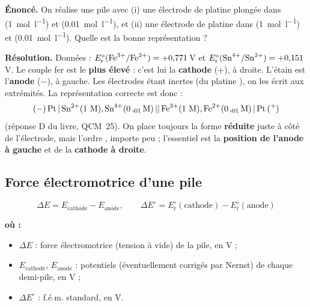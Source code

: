 \documentclass[11pt,a4paper]{article}
\newenvironment{ou}{%
  \par\smallskip\noindent\textbf{où :}\nopagebreak
  \begin{itemize}[leftmargin=1.8em,topsep=2pt,itemsep=1.5pt,parsep=0pt]}%
  {\end{itemize}}
\newcommand{\degner}[1]{\ensuremath{E_{\mathrm{r}}^{\circ}(#1)}}  %
\newcommand{\fem}{\ensuremath{\Delta E}}        %
\begin{document}
\begin{exemple}
\textbf{Énoncé.} On réalise une pile avec (i) une électrode de platine plongée dans
 (\SI{1}{mol\per\litre}) et  (\SI{0.01}{mol\per\litre}), et (ii) une
électrode de platine dans  (\SI{1}{mol\per\litre}) et  (\SI{0.01}{mol\per\litre}).
Quelle est la bonne représentation ?

\textbf{Résolution.} Données : $\degner{\ce{Fe^{3+}}/\ce{Fe^{2+}}}=+0{,}771$\,V et
$\degner{\ce{Sn^{4+}}/\ce{Sn^{2+}}}=+0{,}151$\,V. Le couple fer est le \textbf{plus élevé} : c'est
lui la \textbf{cathode} ($+$), à droite. L'étain est l'\textbf{anode} ($-$), à gauche. Les électrodes
étant inertes (du platine ), on les écrit aux extrémités. La représentation correcte est
donc :
\[
\ce{(-) Pt | Sn^{2+}(1\,M), Sn^{4+}(0{,}01\,M) || Fe^{3+}(1\,M), Fe^{2+}(0{,}01\,M) | Pt (+)}
\]
(réponse D du livre, QCM~25). On place toujours la forme \textbf{réduite} juste à côté de
l'électrode, mais l'ordre , importe peu ; l'essentiel est la
\textbf{position de l'anode à gauche} et de la \textbf{cathode à droite}.
\end{exemple}

\subsection{Force électromotrice d'une pile}

\begin{formule}
\[
\fem=E_{\text{cathode}}-E_{\text{anode}},\qquad
\fem^{\circ}=E_{\mathrm{r}}^{\circ}(\text{cathode})-E_{\mathrm{r}}^{\circ}(\text{anode})
\]
\begin{ou}
  \item $\fem$ : force électromotrice (tension à vide) de la pile, en V ;
  \item $E_{\text{cathode}}$, $E_{\text{anode}}$ : potentiels (éventuellement corrigés par Nernst)
        de chaque demi-pile, en V ;
  \item $\fem^{\circ}$ : f.é.m. standard, en V.
\end{ou}
\end{formule}
\end{document}

